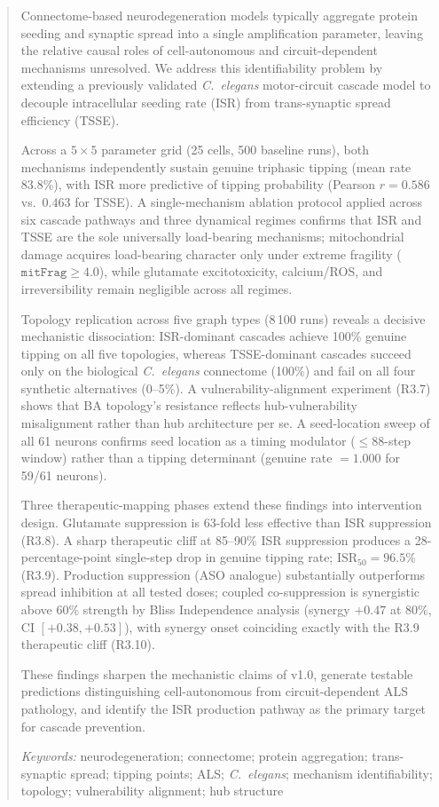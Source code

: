 \documentclass[12pt,a4paper]{article}
\begin{document}
\begin{abstract}
Connectome-based neurodegeneration models typically aggregate protein seeding and synaptic
spread into a single amplification parameter, leaving the relative causal roles of
cell-autonomous and circuit-dependent mechanisms unresolved. We address this identifiability
problem by extending a previously validated \textit{C.~elegans} motor-circuit cascade model
\citep{rezaee2026v1} to decouple intracellular seeding rate (ISR) from trans-synaptic spread
efficiency (TSSE).

Across a $5{\times}5$ parameter grid (25 cells, 500 baseline runs), both mechanisms
independently sustain genuine triphasic tipping (mean rate 83.8\%), with ISR more predictive
of tipping probability (Pearson $r = 0.586$ vs.\ $0.463$ for TSSE). A single-mechanism
ablation protocol applied across six cascade pathways and three dynamical regimes confirms that
ISR and TSSE are the sole universally load-bearing mechanisms; mitochondrial damage acquires
load-bearing character only under extreme fragility ($\texttt{mitFrag} \geq 4.0$), while
glutamate excitotoxicity, calcium/ROS, and irreversibility remain negligible across all regimes.

Topology replication across five graph types (8\,100 runs) reveals a decisive mechanistic
dissociation: ISR-dominant cascades achieve 100\% genuine tipping on all five topologies,
whereas TSSE-dominant cascades succeed only on the biological \textit{C.~elegans} connectome
(100\%) and fail on all four synthetic alternatives (0--5\%). A vulnerability-alignment
experiment (R3.7) shows that BA topology's resistance reflects hub-vulnerability misalignment
rather than hub architecture per se. A seed-location sweep of all 61 neurons confirms seed
location as a timing modulator ($\leq 88$-step window) rather than a tipping determinant
(genuine rate $= 1.000$ for 59/61 neurons).

Three therapeutic-mapping phases extend these findings into intervention design. Glutamate
suppression is 63-fold less effective than ISR suppression (R3.8). A sharp therapeutic cliff
at 85--90\% ISR suppression produces a 28-percentage-point single-step drop in genuine tipping
rate; $\mathrm{ISR}_{50} = 96.5\%$ (R3.9). Production suppression (ASO analogue) substantially
outperforms spread inhibition at all tested doses; coupled co-suppression is synergistic above
60\% strength by Bliss Independence analysis (synergy $+0.47$ at 80\%, CI $[+0.38, +0.53]$),
with synergy onset coinciding exactly with the R3.9 therapeutic cliff (R3.10).

These findings sharpen the mechanistic claims of v1.0, generate testable predictions
distinguishing cell-autonomous from circuit-dependent ALS pathology, and identify the ISR
production pathway as the primary target for cascade prevention.

\smallskip
\noindent\textit{Keywords:} neurodegeneration; connectome; protein aggregation; trans-synaptic
spread; tipping points; ALS; \textit{C.~elegans}; mechanism identifiability; topology;
vulnerability alignment; hub structure
\end{abstract}
\end{document}
